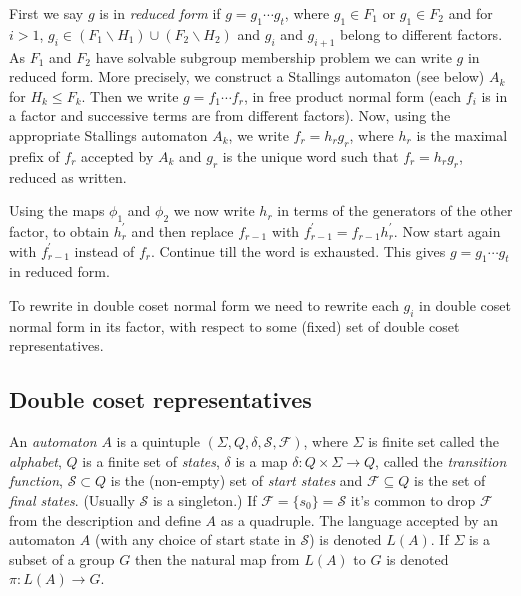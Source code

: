\documentclass[a4paper,12pt]{article}
\renewcommand{\d}{\delta }
\renewcommand{\S}{\Sigma }
\numberwithin{equation}{section}
\numberwithin{figure}{section}
\newcommand{\maps}{\rightarrow}
\begin{document}
First we say $g$ is in \emph{reduced form} if $g = g_1 \cdots g_t$, where
$g_1 \in F_1$ or $g_1 \in F_2$ and
for
$i > 1$,    $g_i \in (F_1 \backslash H_1)\cup (F_2\backslash H_2)$ and  $g_i$
and  ${g_{i+1}}$ belong to  different factors. As $F_1$ and
$F_2$ have solvable subgroup membership problem we can write $g$ in
reduced form. More precisely, we construct a Stallings automaton
(see below) $A_k$ for
$H_k\le F_k$. %
Then we write $g=f_1\cdots f_r$, in free product normal
form (each $f_i$ is in a factor and successive terms are
from different factors).
Now,
using the appropriate Stallings automaton $A_k$, we write $f_r=h_rg_r$, where
$h_r$ is the maximal prefix of $f_r$ accepted by $A_k$ and $g_r$ is
 the
unique word such that $f_r=h_rg_r$, reduced as written.

Using the maps $\phi_1$ and $\phi_2$ we now write $h_r$ in terms of the
generators of the other factor, to obtain $h^\prime_r$ and then
replace $f_{r-1}$ with $f_{r-1}^\prime=f_{r-1}h^\prime_r$. Now start again with
$f_{r-1}^\prime$ instead of $f_r$. Continue till the word is exhausted.
This gives $g=g_1\cdots g_t$ in reduced form.

To rewrite in double coset normal form we need to
 rewrite
each $g_i$ in double coset normal form in its factor,
with respect to some (fixed) set
of double coset representatives.

\subsection{Double coset representatives}\label{sub:2cosetrepr}

An {\em automaton} $A$ is  a quintuple
$(\S,Q,\d,\mathcal{S},\mathcal{F})$, where $\S$ is finite set
called the {\em alphabet}, $Q$ is a finite set of {\em states},
$\d$ is a map $\d:Q\times \S\maps Q$, called the {\em transition
function}, $\mathcal{S}\subset Q$ is the (non-empty) set of {\em
start states} and $\mathcal{F}\subseteq Q$ is the set of {\em
final states}. (Usually $\mathcal{S}$ is a singleton.) If
$\mathcal{F}=\{s_0\}=\mathcal{S}$ it's common to drop
$\mathcal{F}$ from the description and define $A$ as a quadruple.
The language accepted by an automaton $A$ (with any choice of
start state in $\mathcal{S}$) is denoted $L(A)$. If $\S$ is a
subset of a group $G$
 then the  natural map from $L(A)$ to
$G$ is denoted $\pi:L(A)\maps G$.
\end{document}
